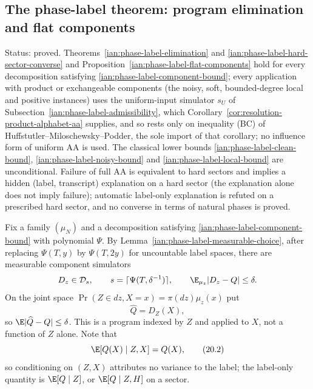 \subsection{The phase-label theorem: program elimination and flat components}
\label{ian:phase-label-theorem}

Status: proved. Theorems~\ref{ian:phase-label-elimination} and \ref{ian:phase-label-hard-sector-converse} and Proposition~\ref{ian:phase-label-flat-components} hold for every decomposition satisfying \eqref{ian:phase-label-component-bound}; every application with product or exchangeable components (the noisy, soft, bounded-degree local and positive instances) uses the uniform-input simulator \(s_U\) of Subsection~\ref{ian:phase-label-admissibility}, which Corollary~\ref{cor:resolution-product-alphabet-aa} supplies, and so rests only on inequality (BC) of Huffstutler--Miloschewsky--Podder, the sole import of that corollary; no influence form of uniform AA is used. The classical lower bounds \eqref{ian:phase-label-clean-bound}, \eqref{ian:phase-label-noisy-bound} and \eqref{ian:phase-label-local-bound} are unconditional. Failure of full AA is equivalent to hard sectors and implies a hidden (label, transcript) explanation on a hard sector (the explanation alone does not imply failure); automatic label-only explanation is refuted on a prescribed hard sector, and no converse in terms of natural phases is proved.

Fix a family \((\mu_N)\) and a decomposition satisfying
\eqref{ian:phase-label-component-bound} with polynomial \(\Psi\). By
Lemma~\ref{ian:phase-label-measurable-choice}, after replacing
\(\Psi(T,y)\) by \(\Psi(T,2y)\) for uncountable label spaces, there are
measurable component simulators
\[
 D_z\in\mathcal D_s,\qquad
 s=\lceil\Psi(T,\delta^{-1})\rceil,\qquad
 \E_{\mu_z}|D_z-Q|\le\delta .
\]
On the joint space \(\Pr(Z\in dz,X=x)=\pi(dz)\mu_z(x)\) put
\[
 \widehat Q=D_Z(X),
 \tag{20.1}\label{ian:phase-label-program}
\]
so \(\E|\widehat Q-Q|\le\delta\). This is a program indexed by \(Z\) and
applied to \(X\), not a function of \(Z\) alone. Note that
\[
 \E[Q(X)\mid Z,X]=Q(X),
 \tag{20.2}\label{ian:phase-label-conditioning-correction}
\]
so conditioning on \((Z,X)\) attributes no variance to the label; the
label-only quantity is \(\E[Q\mid Z]\), or \(\E[Q\mid Z,H]\) on a sector.


